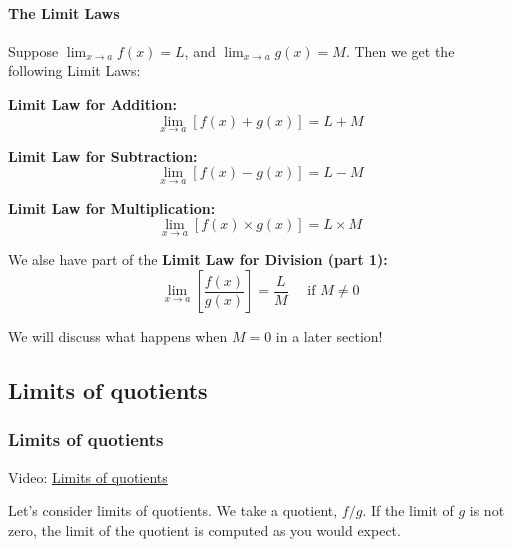 \documentclass[pdftex, brazil, 12pt, twoside]{article}
\begin{document}
\paragraph{The Limit Laws}
Suppose $\displaystyle \lim_{x \to a}f(x) = L$, and $\displaystyle \lim_{x \to a}g(x) = M$.
Then we get the following Limit Laws:

\textbf{Limit Law for Addition:}
\begin{equation}
  \lim_{x \to a}\left[f(x) + g(x)\right] = L + M
\end{equation}

\textbf{Limit Law for Subtraction:}
\begin{equation}
  \lim_{x \to a}\left[f(x) - g(x)\right] = L - M
\end{equation}

\textbf{Limit Law for Multiplication:}
\begin{equation}
  \lim_{x \to a}\left[f(x) \times g(x)\right] = L \times M
\end{equation}

We alse have part of the \textbf{Limit Law for Division (part 1):}
\begin{equation}
  \lim_{x \to a}\left[\frac{f(x)}{g(x)}\right] = \frac{L}{M} \quad \text{ if } M \ne 0
\end{equation}

We will discuss what happens when $M=0$ in a later section!


\subsection{Limits of quotients}
\label{u0-lim-quo}

\subsubsection{Limits of quotients}
\label{u0-lim-quo-lim}

Video: \href{https://www.youtube.com/watch?v=KFqbk49EHFM}{Limits of quotients}

Let's consider limits of quotients.
We take a quotient, $f/g$.
If the limit of $g$ is not zero, the limit of the quotient
is computed as you would expect.

\begin{figure}[H]
  \begin{center}
  \end{center}
\end{figure}
\end{document}
